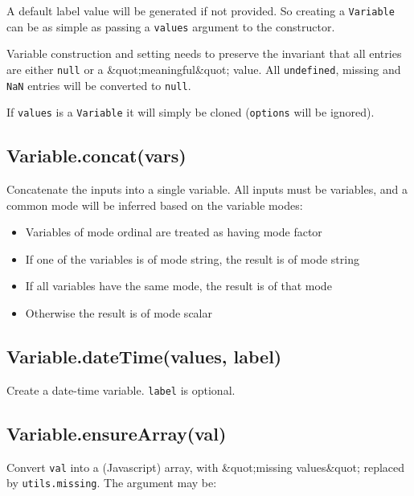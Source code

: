 \documentclass{article}
\begin{document}
A default label value will be generated if not provided. So creating a \texttt{Variable} can
be as simple as passing a \texttt{values} argument to the constructor.


Variable construction and setting needs to preserve the invariant that all entries are
either \texttt{null} or a \&quot;meaningful\&quot; value. All \texttt{undefined}, missing and \texttt{NaN} entries will be
converted to \texttt{null}.


If \texttt{values} is a \texttt{Variable} it will simply be cloned (\texttt{options} will be ignored).


    \subsection*{Variable.concat(vars)}
    Concatenate the inputs into a single variable. All inputs must be variables,
and a common mode will be inferred based on the variable modes:


\begin{itemize}

\item Variables of mode ordinal are treated as having mode factor

\item If one of the variables is of mode string, the result is of mode string

\item If all variables have the same mode, the result is of that mode

\item Otherwise the result is of mode scalar

\end{itemize}

    \subsection*{Variable.dateTime(values, label)}
    Create a date-time variable. \texttt{label} is optional.


    \subsection*{Variable.ensureArray(val)}
    Convert \texttt{val} into a (Javascript) array, with \&quot;missing values\&quot;
replaced by \texttt{utils.missing}. The argument may be:
\end{document}

